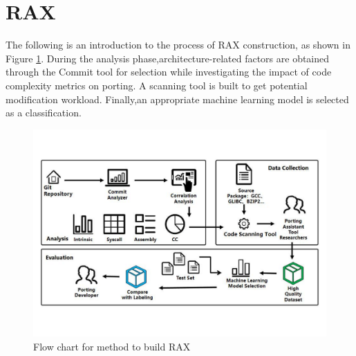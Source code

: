 \documentclass[sigconf,screen,review,anonymous]{acmart}
\begin{document}

\section{RAX}
The following is an introduction to the process of RAX construction, as shown in Figure \ref{fig:figure1}.
During the analysis phase,architecture-related factors are obtained through the Commit tool for selection while investigating the impact of code complexity metrics on porting.
A scanning tool is built to get potential modification workload.
Finally,an appropriate machine learning model is selected as a classification.
\begin{figure}
  \centering
  \includegraphics[width=\linewidth]{figure1.pdf}
  \caption{Flow chart for method to build RAX}
  \label{fig:figure1}
\end{figure}
\end{document}
